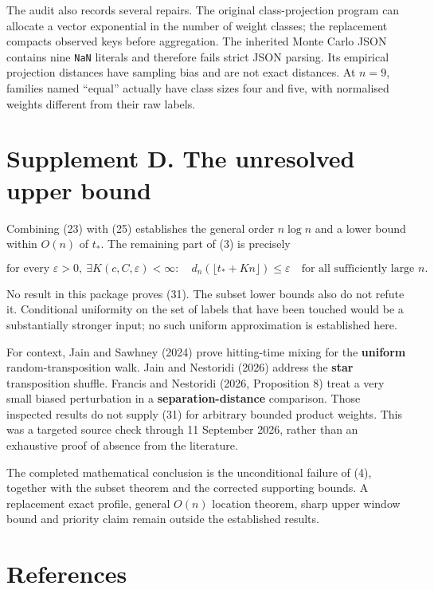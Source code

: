 \documentclass[
  british,
  11pt,
]{article}
\begin{document}
The audit also records several repairs. The original class-projection
program can allocate a vector exponential in the number of weight
classes; the replacement compacts observed keys before aggregation. The
inherited Monte Carlo JSON contains nine \texttt{NaN} literals and
therefore fails strict JSON parsing. Its empirical projection distances
have sampling bias and are not exact distances. At \(n=9\), families
named ``equal'' actually have class sizes four and five, with normalised
weights different from their raw labels.

\section{Supplement D. The unresolved upper
bound}\label{supplement-d.-the-unresolved-upper-bound}

Combining (23) with (25) establishes the general order \(n\log n\) and a
lower bound within \(O(n)\) of \(t_*\). The remaining part of (3) is
precisely

\[
\text{for every }\varepsilon>0,\ \exists K(c,C,\varepsilon)<\infty:
\quad d_n(\lfloor t_*+Kn\rfloor)\le\varepsilon
\quad\text{for all sufficiently large }n. \tag{31}
\]

No result in this package proves (31). The subset lower bounds also do
not refute it. Conditional uniformity on the set of labels that have
been touched would be a substantially stronger input; no such uniform
approximation is established here.

For context, Jain and Sawhney (2024) prove hitting-time mixing for the
\textbf{uniform} random-transposition walk. Jain and Nestoridi (2026)
address the \textbf{star} transposition shuffle. Francis and Nestoridi
(2026, Proposition 8) treat a very small biased perturbation in a
\textbf{separation-distance} comparison. Those inspected results do not
supply (31) for arbitrary bounded product weights. This was a targeted
source check through 11 September 2026, rather than an exhaustive proof
of absence from the literature.

The completed mathematical conclusion is the unconditional failure of
(4), together with the subset theorem and the corrected supporting
bounds. A replacement exact profile, general \(O(n)\) location theorem,
sharp upper window bound and priority claim remain outside the
established results.

\section{References}\label{references}
\end{document}
